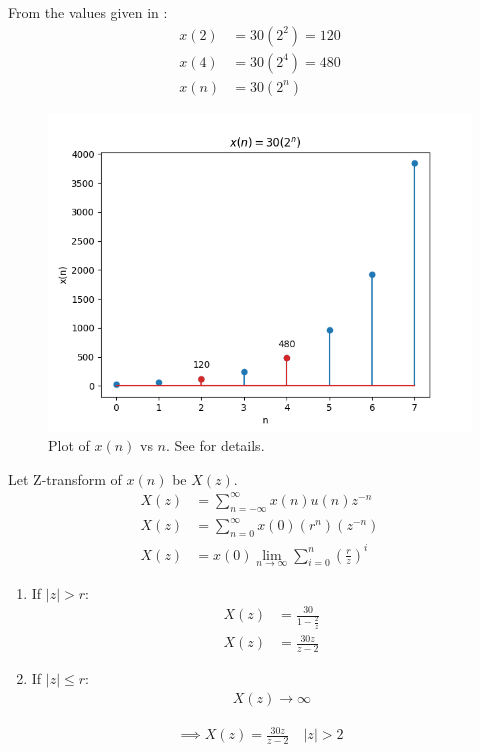 \documentclass[journal,12pt,twocolumn]{IEEEtran}
\theoremstyle{remark}
\begin{document}

From the values given in :
\begin{align}
x(2) &= 30(2^2) = 120 \\
x(4) &= 30(2^4) = 480 \\
x(n) &= 30(2^n)
\end{align}
\begin{figure}[h!]
    \centering
    \includegraphics[width=\columnwidth]{figs/11_9_3_30.png}
    \caption{Plot of $x(n)$ vs $n$. See  for details.}
    \label{fig:1}
\end{figure}
Let Z-transform of $x(n)$ be $X(z)$.
\begin{align}
X(z) &= \sum_{n = -\infty}^{\infty} x(n)u(n)z^{-n} \\
X(z) &= \sum_{n = 0}^{\infty} x(0)(r^n)(z^{-n}) \\
X(z) &= x(0)\lim_{n\to\infty}\sum_{i = 0}^{n}(\frac{r}{z})^i
\end{align}
\begin{enumerate}
\item If $|z| > r$:
\begin{align}
X(z) &= \frac{30}{1 - \frac{2}{z}} \\
X(z) &= \frac{30z}{z - 2}
\end{align}
\item If $|z| \le r$:
\begin{align}
X(z) \to \infty
\end{align}
\end{enumerate}
\begin{align}
\implies X(z) = \frac{30z}{z - 2} \quad |z| > 2
\end{align}
\end{document}
